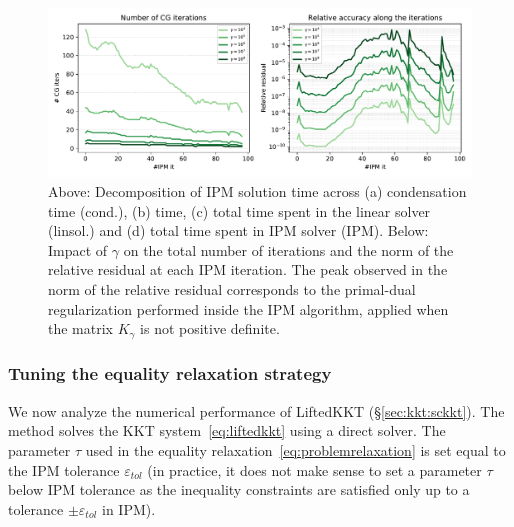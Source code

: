 \begin{figure}[!ht]
  \centering
  \includegraphics[width=\textwidth]{../figures/hybrid-gamma.pdf}
  \caption{
    Above: Decomposition of IPM solution time across
    (a) condensation time (cond.), (b) \CG time, (c) total time
    spent in the linear solver (linsol.) and (d) total time spent in
    IPM solver (IPM).
    Below: Impact of $\gamma$ on the total number of \CG iterations
    and the norm of the relative residual at each IPM iteration.
    The peak observed in the norm of the relative residual corresponds
    to the primal-dual regularization performed inside the IPM algorithm,
    applied when the matrix $K_\gamma$ is not positive definite.
    \label{fig:hybrid:gamma}
  }
\end{figure}


\subsubsection{Tuning the equality relaxation strategy}
We now analyze the numerical performance of LiftedKKT (\S\ref{sec:kkt:sckkt}).
The method solves the KKT system~\eqref{eq:liftedkkt} using a direct solver.
The parameter $\tau$ used in the equality relaxation~\eqref{eq:problemrelaxation}
is set equal to the IPM tolerance $\varepsilon_{tol}$ (in practice, it does not
make sense to set a parameter $\tau$ below IPM tolerance as the
inequality constraints are satisfied only up to a tolerance $\pm \varepsilon_{tol}$
in IPM).

